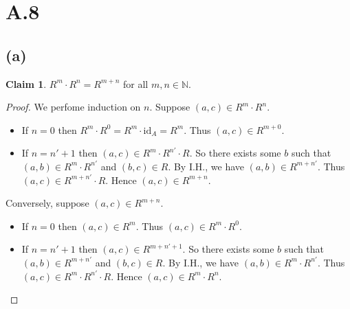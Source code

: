 \documentclass[autodetect-enginem]{article}
\title{}
\author{}
\date{}
\theoremstyle{plain}
\theoremstyle{definition}
\theoremstyle{definition}
\newtheorem{claim}{Claim}
\begin{document}
\section*{A.8}
\subsection*{(a)}
    \begin{claim}
        $R^m \cdot R^n = R^{m+n}$ for all $m,n \in \mathbb{N}$.
    \end{claim}

    \begin{proof}
        We perfome induction on $n$.
        Suppose $(a,c) \in R^m \cdot R^n$.
        \begin{itemize}
            \item If $n = 0$ then $R^m \cdot R^0 = R^m \cdot \mathrm{id}_A = R^m$.
                    Thus $(a,c) \in R^{m+0}$.
            \item If $n = n' + 1$ then $(a,c) \in R^m \cdot R^{n'} \cdot R$.
                    So there exists some $b$ such that $(a,b) \in R^m \cdot R^{n'}$ and $(b,c) \in R$.
                    By I.H., we have $(a,b) \in R^{m+n'}$.
                    Thus $(a,c) \in R^{m+n'} \cdot R$.
                    Hence $(a,c) \in R^{m+n}$.
        \end{itemize}
        Conversely, suppose $(a,c) \in R^{m+n}$.
        \begin{itemize}
            \item If $n=0$ then $(a,c) \in R^m$. Thus $(a,c) \in R^m \cdot R^0$.
            \item If $n=n'+1$ then $(a,c) \in R^{m + n' + 1}$. So there exists some $b$ such that
                    $(a,b) \in R^{m+n'}$ and $(b,c) \in R$.
                    By I.H., we have $(a,b) \in R^{m} \cdot R^{n'}$.
                    Thus $(a,c) \in R^{m} \cdot R^{n'} \cdot R$.
                    Hence $(a,c) \in R^{m} \cdot R^{n}$.
        \end{itemize}
    \end{proof}
\end{document}
